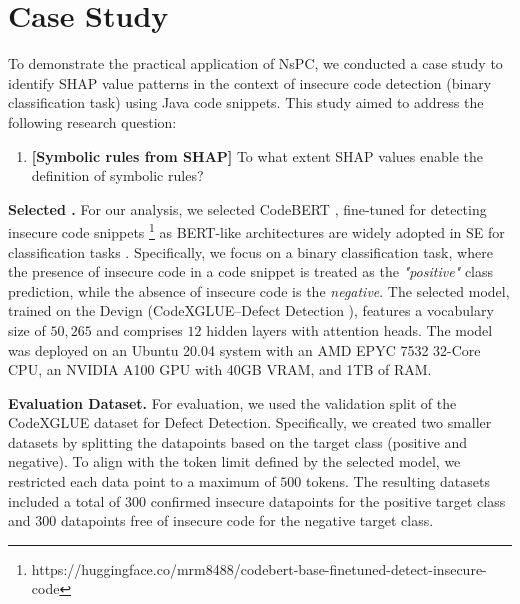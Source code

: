 \section{Case Study}
\label{sec:case_study}

To demonstrate the practical application of NsPC, we conducted a case study to identify SHAP value patterns in the context of insecure code detection (\ie binary classification task) using Java code snippets. This study aimed to address the following research question:

\begin{enumerate}[label=\textbf{RQ$_{\arabic*}$}, ref=\textbf{RQ$_{\arabic*}$}, wide, labelindent=5pt]\setlength{\itemsep}{0.2em}
      \item \label{rq:neuro_symbolic_rules} {\textbf{[Symbolic rules from SHAP]} To what extent SHAP values enable the definition of symbolic rules?}
\end{enumerate}

\textbf{Selected \lcm.} For our analysis, we selected CodeBERT \cite{feng_codebert_2020}, fine-tuned for detecting insecure code snippets \footnote{https://huggingface.co/mrm8488/codebert-base-finetuned-detect-insecure-code} as BERT-like architectures are widely adopted in SE for classification tasks \cite{10.1145/3528588.3528660,9492202,ardimento2020using,chochlov2022using}. Specifically, we focus on a binary classification task, where the presence of insecure code in a code snippet is treated as the \textit{"positive"} class prediction, while the absence of insecure code is the \textit{negative}. The selected model, trained on the Devign \cite{zhou_devign_2019} (CodeXGLUE--Defect Detection \cite{lu_codexglue_2021}), features a vocabulary size of $50,265$ and comprises $12$ hidden layers with attention heads. The model was deployed on an Ubuntu 20.04 system with an AMD EPYC 7532 32-Core CPU, an NVIDIA A100 GPU with 40GB VRAM, and 1TB of RAM.

\textbf{Evaluation Dataset.} For evaluation, we used the validation split of the CodeXGLUE dataset for Defect Detection. Specifically, we created two smaller datasets by splitting the datapoints based on the target class (\ie positive and negative). To align with the token limit defined by the selected model, we restricted each data point to a maximum of $500$ tokens. The resulting datasets included a total of $300$ confirmed insecure datapoints for the positive target class and $300$ datapoints free of insecure code for the negative target class.


